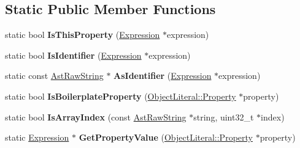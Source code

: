 \subsection*{Static Public Member Functions}
\begin{DoxyCompactItemize}
\item 
static bool {\bfseries Is\+This\+Property} (\hyperlink{classv8_1_1internal_1_1_expression}{Expression} $\ast$expression)\hypertarget{classv8_1_1internal_1_1_parser_traits_a18441854b73ca5e19d9e0e1b5bfb60b6}{}\label{classv8_1_1internal_1_1_parser_traits_a18441854b73ca5e19d9e0e1b5bfb60b6}

\item 
static bool {\bfseries Is\+Identifier} (\hyperlink{classv8_1_1internal_1_1_expression}{Expression} $\ast$expression)\hypertarget{classv8_1_1internal_1_1_parser_traits_afd0b2cb75bc97aea8797e0dedcc1a4a2}{}\label{classv8_1_1internal_1_1_parser_traits_afd0b2cb75bc97aea8797e0dedcc1a4a2}

\item 
static const \hyperlink{classv8_1_1internal_1_1_ast_raw_string}{Ast\+Raw\+String} $\ast$ {\bfseries As\+Identifier} (\hyperlink{classv8_1_1internal_1_1_expression}{Expression} $\ast$expression)\hypertarget{classv8_1_1internal_1_1_parser_traits_a1b9ce47fe3ddaedac13204176e241805}{}\label{classv8_1_1internal_1_1_parser_traits_a1b9ce47fe3ddaedac13204176e241805}

\item 
static bool {\bfseries Is\+Boilerplate\+Property} (\hyperlink{classv8_1_1internal_1_1_object_literal_property}{Object\+Literal\+::\+Property} $\ast$property)\hypertarget{classv8_1_1internal_1_1_parser_traits_a578c0594771c3ec77513ad986e5e57a4}{}\label{classv8_1_1internal_1_1_parser_traits_a578c0594771c3ec77513ad986e5e57a4}

\item 
static bool {\bfseries Is\+Array\+Index} (const \hyperlink{classv8_1_1internal_1_1_ast_raw_string}{Ast\+Raw\+String} $\ast$string, uint32\+\_\+t $\ast$index)\hypertarget{classv8_1_1internal_1_1_parser_traits_a79af7977af749454229e6e0d6054f1b8}{}\label{classv8_1_1internal_1_1_parser_traits_a79af7977af749454229e6e0d6054f1b8}

\item 
static \hyperlink{classv8_1_1internal_1_1_expression}{Expression} $\ast$ {\bfseries Get\+Property\+Value} (\hyperlink{classv8_1_1internal_1_1_object_literal_property}{Object\+Literal\+::\+Property} $\ast$property)\hypertarget{classv8_1_1internal_1_1_parser_traits_a32e9f3ad54474f61a9cad0195bda0030}{}\label{classv8_1_1internal_1_1_parser_traits_a32e9f3ad54474f61a9cad0195bda0030}


\end{DoxyCompactItemize}
